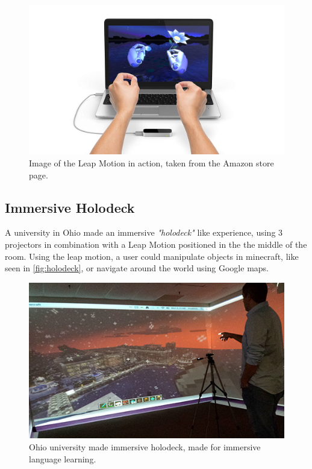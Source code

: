     \begin{figure}[H]
    	\centering
    	\includegraphics[width=0.9\linewidth]{figure/Analysis/leapMotion.jpg}
    	\caption{Image of the Leap Motion in action, taken from the Amazon store page.}
    	\label{fig:leapMotion}
    \end{figure}
    
\subsection{Immersive Holodeck}\label{sec:leapMotionHolodeck} %
    A university in Ohio made an immersive \textit{"holodeck"} like experience, using 3 projectors in combination with a Leap Motion positioned in the the middle of the room. Using the leap motion, a user could manipulate objects in minecraft, like seen in \autoref{fig:holodeck}, or navigate around the world using Google maps\cite{leapMotionHolodeck}.
    
    \begin{figure}[H]
    	\centering
    	\includegraphics[width=0.7\linewidth]{figure/Analysis/holodeck.jpg}
    	\caption{Ohio university made immersive holodeck, made for immersive language learning\cite{leapMotionHolodeck}.}
    	\label{fig:holodeck}
    \end{figure}
    

